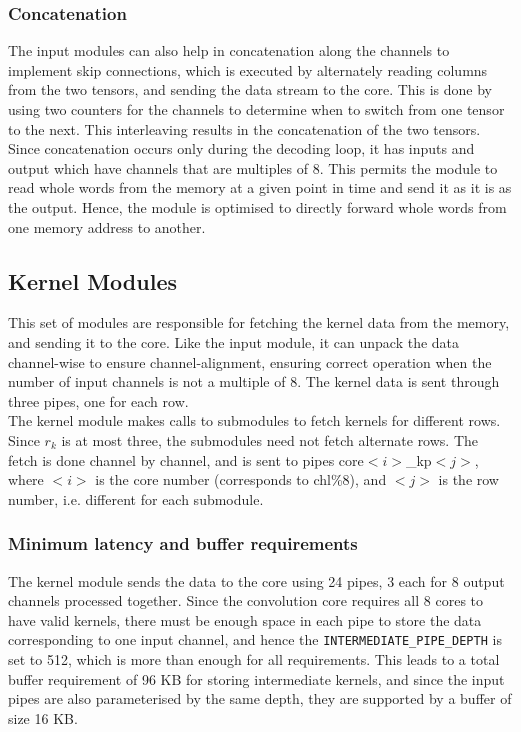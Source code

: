 \documentclass[a4paper,12pt, final]{report}
\begin{document}
\subsubsection{Concatenation}

The input modules can also help in concatenation along the channels to implement skip connections, which is executed by alternately reading columns from the two tensors, and sending the data stream to the core. This is done by using two counters for the channels to determine when to switch from one tensor to the next. This interleaving results in the concatenation of the two tensors.
\\

Since concatenation occurs only during the decoding loop, it has inputs and output which have channels that are multiples of 8. This permits the module to read whole words from the memory at a given point in time and send it as it is as the output. Hence, the module is optimised to directly forward whole words from one memory address to another.


\subsection{Kernel Modules}

This set of modules are responsible for fetching the kernel data from the memory, and sending it to the core. Like the input module, it can unpack the data channel-wise to ensure channel-alignment, ensuring correct operation when the number of input channels is not a multiple of 8. The kernel data is sent through three pipes, one for each row.
\\

The kernel module makes calls to submodules to fetch kernels for different rows. Since $r_k$ is at most three, the submodules need not fetch alternate rows. The fetch is done channel by channel, and is sent to pipes core$<i>$\_kp$<j>$, where $<i>$ is the core number (corresponds to chl\%8), and $<j>$ is the row number, i.e. different for each submodule.

\subsubsection{Minimum latency and buffer requirements}

The kernel module sends the data to the core using 24 pipes, 3 each for 8 output channels processed together. Since the convolution core requires all 8 cores to have valid kernels, there must be enough space in each pipe to store the data corresponding to one input channel, and hence the \verb|INTERMEDIATE_PIPE_DEPTH| is set to 512, which is more than enough for all requirements. This leads to a total buffer requirement of 96 KB for storing intermediate kernels, and since the input pipes are also parameterised by the same depth, they are supported by a buffer of size 16 KB.
\\
\end{document}
